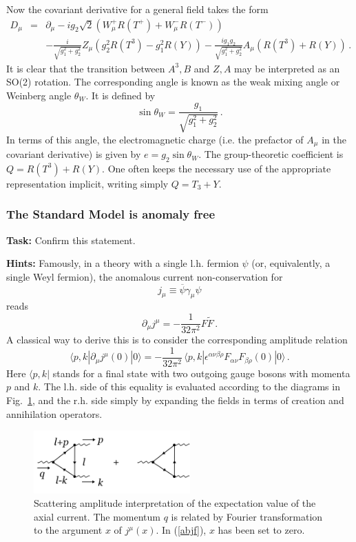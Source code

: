 \documentclass[12pt]{article}
\newcommand{\be}{\begin{equation}}
\newcommand{\ee}{\end{equation}}
\newcommand{\bea}{\begin{eqnarray}}
\newcommand{\eea}{\end{eqnarray}}
\newcommand{\ol}{\overline}
\numberwithin{equation}{section}
\begin{document}
Now the covariant derivative for a general field takes the form
\bea
D_\mu&=&\partial_\mu-ig_2\sqrt{2}(W^+_\mu R(T^+)+W^-_\mu R(T^-))
\\
&&-\frac{i}{\sqrt{g_1^2+g_2^2}}Z_\mu(g_2^2R(T^3)-g_1^2R(Y))
-\frac{ig_1g_2}{\sqrt{g_1^2+g_2^2}}A_\mu(R(T^3)+R(Y))\,.
\eea
It is clear that the transition between $A^3,B$ and $Z,A$ may be interpreted as an SO(2) rotation. The corresponding angle is known as the weak mixing angle or Weinberg angle $\theta_W$.  It is defined by
\be
\sin\theta_W=\frac{g_1}{\sqrt{g_1^2+g_2^2}}\,.
\ee
In terms of this angle, the electromagnetic charge (i.e. the prefactor of $A_\mu$ in the covariant derivative) is given by $e=g_2\sin\theta_W$. The group-theoretic coefficient is $Q=R(T^3)+R(Y)$. One often keeps the necessary use of the appropriate representation implicit, writing simply $Q=T_3+Y$.






\subsubsection{The Standard Model is anomaly free}

{\bf Task:} Confirm this statement.

\noindent
{\bf Hints:} Famously, in a theory with a single l.h. fermion $\psi$ (or, equivalently, a single Weyl fermion), the anomalous current non-conservation for 
\be
j_\mu\equiv \ol{\psi}\gamma_\mu\psi
\ee
reads
\be
\partial_\mu j^\mu=- \frac{1}{32\pi^2}F\tilde{F}\,.
\ee
A classical way to derive this is to consider the corresponding amplitude relation
\be
\langle p,k|\partial_\mu j^\mu(0)|0\rangle = -\frac{1}{32\pi^2}\,\langle p,k|\epsilon^{\alpha\nu\beta\rho} F_{\alpha\nu} F_{\beta\rho}(0)|0\rangle\,.
\label{abjf}
\ee
Here $\langle p,k|$ stands for a final state with two outgoing gauge bosons with momenta $p$ and $k$. The l.h. side of this equality is evaluated according to the diagrams in Fig.~\ref{abj}, and the r.h. side simply by expanding the fields in terms of creation and annihilation operators.

\begin{figure}[ht]
\begin{center} 
\includegraphics[width=6cm]{abj.png}
\caption{Scattering amplitude interpretation of the expectation value of the axial current. The momentum $q$ is related by Fourier transformation to the argument $x$ of $j^\mu(x)$. In (\ref{abjf}), $x$ has been set to zero.}
\label{abj} 
\end{center}
\end{figure}
\end{document}
